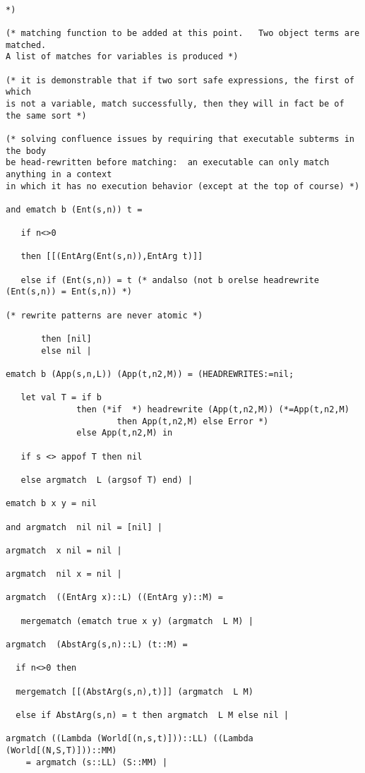 \documentclass{article}
\begin{document}
\begin{verbatim}

*)

(* matching function to be added at this point.   Two object terms are matched.
A list of matches for variables is produced *)

(* it is demonstrable that if two sort safe expressions, the first of which
is not a variable, match successfully, then they will in fact be of the same sort *)

(* solving confluence issues by requiring that executable subterms in the body
be head-rewritten before matching:  an executable can only match anything in a context
in which it has no execution behavior (except at the top of course) *)

and ematch b (Ent(s,n)) t = 

   if n<>0

   then [[(EntArg(Ent(s,n)),EntArg t)]]

   else if (Ent(s,n)) = t (* andalso (not b orelse headrewrite (Ent(s,n)) = Ent(s,n)) *)

(* rewrite patterns are never atomic *)

       then [nil]
       else nil |

ematch b (App(s,n,L)) (App(t,n2,M)) = (HEADREWRITES:=nil;

   let val T = if b 
              then (*if  *) headrewrite (App(t,n2,M)) (*=App(t,n2,M) 
                      then App(t,n2,M) else Error *)
              else App(t,n2,M) in

   if s <> appof T then nil

   else argmatch  L (argsof T) end) |

ematch b x y = nil

and argmatch  nil nil = [nil] |

argmatch  x nil = nil |

argmatch  nil x = nil |

argmatch  ((EntArg x)::L) ((EntArg y)::M) =

   mergematch (ematch true x y) (argmatch  L M) |

argmatch  (AbstArg(s,n)::L) (t::M) =

  if n<>0 then

  mergematch [[(AbstArg(s,n),t)]] (argmatch  L M)

  else if AbstArg(s,n) = t then argmatch  L M else nil |

argmatch ((Lambda (World[(n,s,t)]))::LL) ((Lambda (World[(N,S,T)]))::MM) 
    = argmatch (s::LL) (S::MM) |


\end{verbatim}
\end{document}
